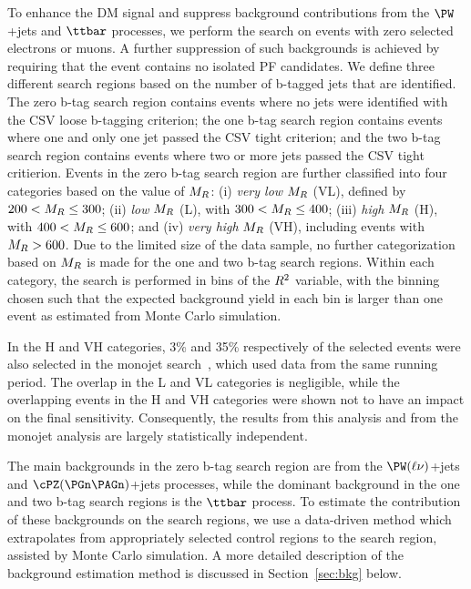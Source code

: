 To enhance the DM signal and suppress background contributions from the $\PW$+jets and $\ttbar$ processes,
we perform the search on events with zero selected electrons or muons.
A further suppression of such backgrounds is achieved by requiring that the event contains no isolated 
PF candidates. We define three different search regions based on the number of b-tagged jets that are
identified. The zero b-tag search region contains events where no jets were identified with the CSV loose 
b-tagging criterion; the one b-tag search region contains events where one and only one jet
passed the CSV tight criterion; and the two b-tag search region contains events where two or more
jets passed the CSV tight critierion. Events in the zero b-tag search region are further classified 
into four categories based on the value of $M_R$: 
(i) \textit{very low} $M_R$ (VL), defined by $200<M_R \leq 300$\GeV; 
(ii) \textit{low} $M_R$ (L), with $300 <M_R \leq 400$\GeV; 
(iii) \textit{high} $M_R$ (H), with $400 <M_R\leq 600$\GeV; 
and (iv) \textit{very high} $M_R$ (VH), including events with $M_R>600$\GeV. 
Due to the limited size of the data sample, no further 
categorization based on $M_R$ is made for the one and two b-tag search regions.
Within each category, the search is performed in bins of the $R^2$
variable, with the binning chosen such that the expected background yield
in each bin is larger than one event as estimated from Monte Carlo simulation.

In the H and VH categories, 3\% and 35\% respectively of the selected
events were also selected in the monojet search~\cite{monojet8TeV}, which used data from 
the same running period. The overlap in the L and VL categories is negligible, while the 
overlapping events in the H and VH categories were shown not to have an impact on the final 
sensitivity. Consequently, the results from this analysis and from the monojet analysis 
are largely statistically independent.

The main backgrounds in the zero b-tag search region are from the $\PW(\ell\nu)$+jets 
and $\cPZ(\PGn\PAGn)$+jets processes, while the dominant background in the one and two
b-tag search regions is the $\ttbar$ process. To estimate the contribution of these
backgrounds on the search regions, we use a data-driven method which extrapolates
from appropriately selected control regions to the search region, assisted by 
Monte Carlo simulation. A more detailed description of the background
estimation method is discussed in Section~\ref{sec:bkg} below. 

